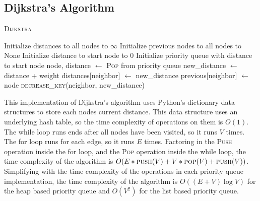 \documentclass[12pt]{article}
\begin{document}
\subsection{Dijkstra's Algorithm}

\begin{algorithm}[H]
    \caption{\textsc{Dijkstra}}
    \begin{algorithmic}[1]
        \State Initialize distances to all nodes to $\infty$ 
        \State Initialize previous nodes to all nodes to None 
        \State Initialize distance to start node to 0
        \State Initialize priority queue with distance to start node 
         
            \State node, distance $\gets$ \textsc{Pop} from priority queue 
             
                \State new\_distance $\gets$ distance + weight
                    \State distances[neighbor] $\gets$ new\_distance
                    \State previous[neighbor] $\gets$ node
                    \State \textsc{decrease\_key}(neighbor, new\_distance) 
                \EndIf
            \EndFor
        \EndWhile

    \end{algorithmic}
\end{algorithm}

This implementation of Dijkstra's algorithm uses Python's dictionary data
structures to store each nodes current distance. This data structure
uses an underlying hash table, so the time complexity of operations on them is
$O(1)$. The while loop runs ends after all nodes have been visited, so it runs
$V$ times. The for loop runs for each edge, so it runs $E$ times. Factoring in
the \textsc{Push} operation inside the for loop, and the \textsc{Pop} operation
inside the while loop, the time complexity of the algorithm is $O(E * \textsc{push}(V)
 + V * \textsc{pop}(V) + \textsc{push}(V))$. Simplifying with the time complexity
of the operations in each priority queue implementation, the time complexity of
the algorithm is $O((E+V)\log V)$ for the heap based priority queue and $O(V^2)$
for the list based priority queue.
\end{document}
